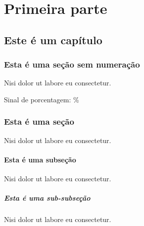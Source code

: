 \documentclass{book}
\begin{document}
\part{Primeira parte}

\chapter{Este é um capítulo}

\section*{Esta é uma seção sem numeração}

Nisi dolor ut labore eu consectetur.

Sinal de porcentagem: \%

\section{Esta é uma seção}

Nisi dolor ut labore eu consectetur.

\subsection{Esta é uma subseção}

Nisi dolor ut labore eu consectetur.

\subsubsection{Esta é uma sub-subseção}

Nisi dolor ut labore eu consectetur.
\end{document}

